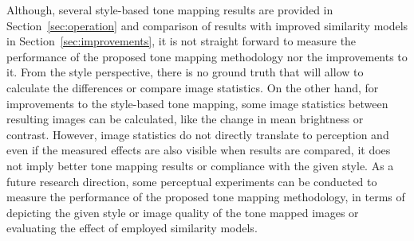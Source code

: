 Although, several style-based tone mapping results are provided in Section~\ref{sec:operation} and comparison of results with improved similarity models in Section~\ref{sec:improvements}, it is not straight forward to measure the performance of the proposed tone mapping methodology nor the improvements to it. From the style perspective, there is no ground truth that will allow to calculate the differences or compare image statistics. On the other hand, for improvements to the style-based tone mapping, some image statistics between resulting images can be calculated, like the change in mean brightness or contrast. However, image statistics do not directly translate to perception and even if the measured effects are also visible when results are compared, it does not imply better tone mapping results or compliance with the given style. As a future research direction, some perceptual experiments can be conducted to measure the performance of the proposed tone mapping methodology, in terms of depicting the given style or image quality of the tone mapped images or evaluating the effect of employed similarity models.  

